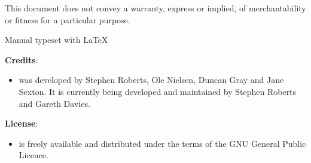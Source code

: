 This document does not convey a warranty, express or implied,
of merchantability or fitness for a particular purpose.

\begin{center}
   \anuga

   Manual typeset with \LaTeX
\end{center}

\vspace{0.5in}

\textbf{Credits}:
\begin{itemize}
\item \anuga was developed by Stephen Roberts, Ole Nielsen, Duncan Gray and Jane Sexton. It is currently being developed and
 maintained by Stephen Roberts and Gareth Davies.
\end{itemize}

\textbf{License}:
\begin{itemize}
\item \anuga is freely available and distributed under the terms of the GNU General Public Licence.
\end{itemize}


